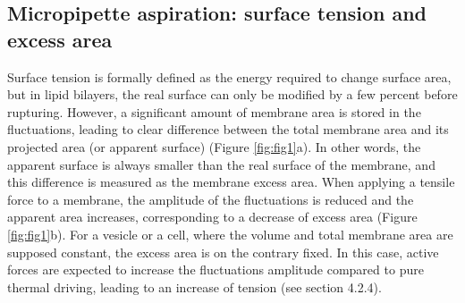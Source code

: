 \documentclass[graybox]{svmult}
\begin{document}
	\subsection{Micropipette aspiration: surface tension and excess area}
Surface tension is formally defined as the energy required to change surface area, but in lipid bilayers, the real surface can only be modified by a few percent before rupturing. However, a significant amount of membrane area is stored in the fluctuations, leading to clear difference between the total membrane area and its projected area (or apparent surface) (Figure \ref{fig:fig1}a). In other words, the apparent surface is always smaller than the real surface of the membrane, and this difference is measured as the membrane excess area. When applying a tensile force to a membrane, the amplitude of the fluctuations is reduced and the apparent area increases, corresponding to a decrease of excess area (Figure \ref{fig:fig1}b). For a vesicle or a cell, where the volume and total membrane area are supposed constant, the excess area is on the contrary fixed. In this case, active forces are expected to increase the fluctuations amplitude compared to pure thermal driving, leading to an increase of tension (see section 4.2.4).
 
\end{document}
